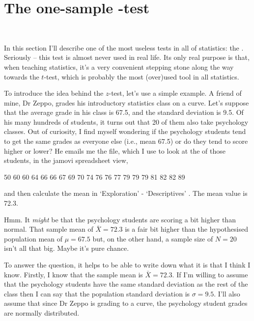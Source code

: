 \section{The one-sample \texorpdfstring{}{}-test}~\label{sec:onesampleztest}

In this section I'll describe one of the most useless tests in all of statistics: the . Seriously -- this test is almost never used in real life. Its only real purpose is that, when teaching statistics, it's a very convenient stepping stone along the way towards the $t$-test, which is probably the most (over)used tool in all statistics.


To introduce the idea behind the $z$-test, let's use a simple example. A friend of mine, Dr Zeppo, grades his introductory statistics class on a curve. Let's suppose that the average grade in his class is 67.5, and the standard deviation is 9.5. Of his many hundreds of students, it turns out that 20 of them also take psychology classes. Out of curiosity, I find myself wondering if the psychology students tend to get the same grades as everyone else (i.e., mean 67.5) or do they tend to score higher or lower? He emails me the  file, which I use to look at the  of those students, in the jamovi spreadsheet view, 
\begin{rblock1}
50 60 60 64 66 66 67 69 70 74 76 76 77 79 79 79 81 82 82 89
\end{rblock1} 
and then calculate the mean in `Exploration' - `Descriptives' . The mean value is 72.3.

Hmm. It {\it might} be that the psychology students are scoring a bit higher than normal. That sample mean of $\bar{X} = 72.3$ is a fair bit higher than the hypothesised population mean of $\mu = 67.5$ but, on the other hand, a sample size of $N = 20$ isn't all that big. Maybe it's pure chance. 

To answer the question, it helps to be able to write down what it is that I think I know. Firstly, I know that the sample mean is $\bar{X} = 72.3$. If I'm willing to assume that the psychology students have the same standard deviation as the rest of the class then I can say that the population standard deviation is $\sigma = 9.5$. I'll also assume that since Dr Zeppo is grading to a curve, the psychology student grades are normally distributed. 

